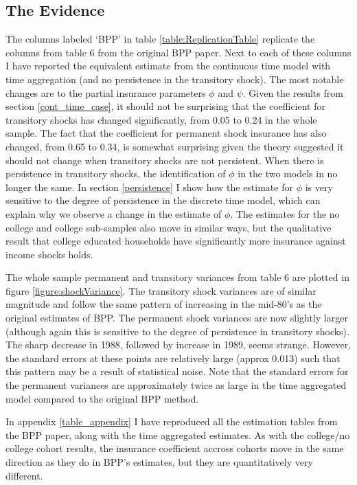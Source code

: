 \documentclass[AER]{AEA}
\begin{document}
\subsection{The Evidence} \label{evidence}
The columns labeled `BPP' in table \ref{table:ReplicationTable} replicate the columns from table 6 from the original BPP paper. Next to each of these columns I have reported the equivalent estimate from the continuous time model with time aggregation (and no persistence in the transitory shock). The most notable changes are to the partial insurance parameters $\phi$ and $\psi$. Given the results from section \ref{cont_time_case}, it should not be surprising that the coefficient for transitory shocks has changed significantly, from 0.05 to 0.24 in the whole sample. The fact that the coefficient for permanent shock insurance has also changed, from 0.65 to 0.34, is somewhat surprising given the theory suggested it should not change when transitory shocks are not persistent. When there is persistence in transitory shocks, the identification of $\phi$ in the two models in no longer the same. In section \ref{persistence} I show how the estimate for $\phi$ is very sensitive to the degree of persistence in the discrete time model, which can explain why we observe a change in the estimate of $\phi$. The estimates for the no college and college sub-samples also move in similar ways, but the qualitative result that college educated households have significantly more insurance against income shocks holds.

The whole sample permanent and transitory variances from table 6 are plotted in figure \ref{figure:shockVariance}. The transitory shock variances are of similar magnitude and follow the same pattern of increasing in the mid-80's as the original estimates of BPP. The permanent shock variances are now slightly larger (although again this is sensitive to the degree of persistence in transitory shocks). The sharp decrease in 1988, followed by increase in 1989, seems strange. However, the standard errors at these points are relatively large (approx 0.013) such that this pattern may be a result of statistical noise. Note that the standard errors for the permanent variances are approximately twice as large in the time aggregated model compared to the original BPP method.

In appendix \ref{table_appendix} I have reproduced all the estimation tables from the BPP paper, along with the time aggregated estimates. As with the college/no college cohort results, the insurance coefficient accross cohorts move in the same direction as they do in BPP's estimates, but they are quantitatively very different.
\end{document}

